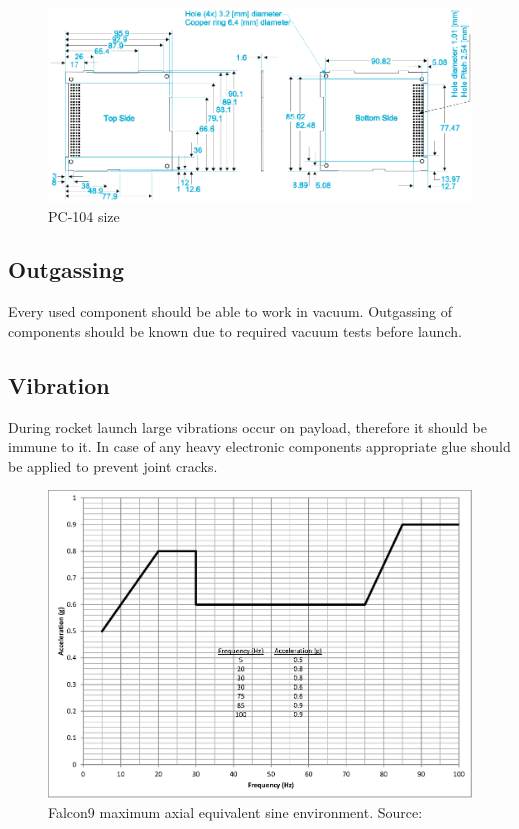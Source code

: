 	\begin{figure}[H]
		\centering
		\includegraphics[width=0.7\paperwidth]{img/PC104_PLD_size.png}
		\caption{PC-104 size}
		\label{PLD_PCB_size}
	\end{figure}	
		
	

\subsection{Outgassing}
	Every used component should be able to work in vacuum. Outgassing of components should be known due to required vacuum tests before launch.
	
\subsection{Vibration}
	During rocket launch large vibrations occur on payload, therefore it should be immune to it. In case of any heavy electronic components appropriate glue should be applied to prevent joint cracks.
	\begin{figure}[H]
		\centering
		\includegraphics[width=0.5\paperwidth]{img/Falcon9_vibration.eps}
		\caption{Falcon9 maximum axial equivalent sine environment. Source: \cite{Falcon9_user_manual}}
		\label{Falcon9_vibration}
	\end{figure}	


